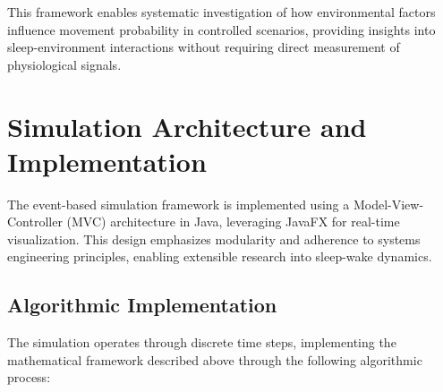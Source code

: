 \documentclass[conference]{IEEEtran}
\begin{document}
This framework enables systematic investigation of how environmental factors influence movement probability in controlled scenarios, providing insights into sleep-environment interactions without requiring direct measurement of physiological signals.
\section{Simulation Architecture and Implementation}

The event-based simulation framework is implemented using a Model-View-Controller (MVC) architecture in Java, leveraging JavaFX for real-time visualization. This design emphasizes modularity and adherence to systems engineering principles, enabling extensible research into sleep-wake dynamics.

\subsection{Algorithmic Implementation}

The simulation operates through discrete time steps, implementing the mathematical framework described above through the following algorithmic process:
\end{document}
